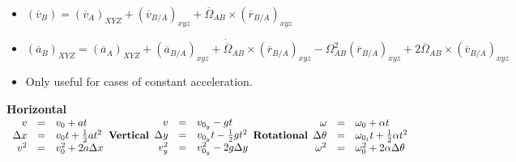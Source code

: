 \documentclass [10pt] {article}
\begin{document}
\begin{multicols*}{2}
\begin{itemize}
			\item $(\overline{v}_B) = (\overline{v}_A)_{XYZ} + (\overline{v}_{B/A})_{xyz} + \overline{\Omega}_{AB} \times (\overline{r}_{B/A})_{xyz}$
			\item $(\overline{a}_B)_{XYZ} = (\overline{a}_A)_{XYZ} + (\overline{a}_{B/A})_{xyz} + \dot{\overline\Omega}_{AB} \times (\overline{r}_{B/A})_{xyz} - \Omega^2_{AB}(\overline{r}_{B/A})_{xyz} + 2\overline{\Omega}_{AB} \times (\overline{v}_{B/A})_{xyz}$
			\item Only useful for cases of constant acceleration. \\
		\end{itemize}
\textbf{Horizontal}\\
	$\begin{array}{rcl}
		v & = & v_0 + at \\
		\Delta{x} & = & v_{0}t + \frac{1}{2}at^2 \\
		v^2 & = & v_{0}^2 + 2a\Delta{x}
	\end{array} \\\\
\textbf{Vertical} \\
	\begin{array}{rcl}
		v & = & v_{0_y} - gt \\
		\Delta{y} & = & v_{0_y} t - \frac{1}{2}gt^2 \\
		v_y^2 & = & v_{0_y}^2 - 2g\Delta{y}
	\end{array} \\\\
\textbf{Rotational} \\
	\begin{array}{rcl}
		\omega & = & \omega_0 + \alpha t \\
		\Delta{\theta} & = & \omega_{0_t} t + \frac{1}{2}\alpha t^2 \\
		\omega^2 & = & \omega_0^2 + 2\alpha \Delta{\theta}
	\end{array}$

\end{multicols*}
\end{document}
